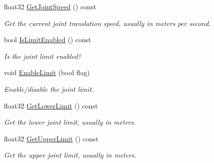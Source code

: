 \begin{DoxyCompactItemize}
\mbox{\label{classb2PrismaticJoint_af407d14ac024abdee49b852613f1bbc2}} 
float32 \mbox{\hyperlink{classb2PrismaticJoint_af407d14ac024abdee49b852613f1bbc2}{Get\+Joint\+Speed}} () const
\begin{DoxyCompactList}\small\item\em Get the current joint translation speed, usually in meters per second. \end{DoxyCompactList}\item 
\mbox{\label{classb2PrismaticJoint_a22e2442a17832f718447c63c9c6263c8}} 
bool \mbox{\hyperlink{classb2PrismaticJoint_a22e2442a17832f718447c63c9c6263c8}{Is\+Limit\+Enabled}} () const
\begin{DoxyCompactList}\small\item\em Is the joint limit enabled? \end{DoxyCompactList}\item 
\mbox{\label{classb2PrismaticJoint_a6d419afe7bd4b0e36d2e4607df7f79f2}} 
void \mbox{\hyperlink{classb2PrismaticJoint_a6d419afe7bd4b0e36d2e4607df7f79f2}{Enable\+Limit}} (bool flag)
\begin{DoxyCompactList}\small\item\em Enable/disable the joint limit. \end{DoxyCompactList}\item 
\mbox{\label{classb2PrismaticJoint_a10a2d3c03164190d279fa3c72eafb49e}} 
float32 \mbox{\hyperlink{classb2PrismaticJoint_a10a2d3c03164190d279fa3c72eafb49e}{Get\+Lower\+Limit}} () const
\begin{DoxyCompactList}\small\item\em Get the lower joint limit, usually in meters. \end{DoxyCompactList}\item 
\mbox{\label{classb2PrismaticJoint_aabae1da55e500b9c77007de4d085ffda}} 
float32 \mbox{\hyperlink{classb2PrismaticJoint_aabae1da55e500b9c77007de4d085ffda}{Get\+Upper\+Limit}} () const
\begin{DoxyCompactList}\small\item\em Get the upper joint limit, usually in meters. \end{DoxyCompactList}\item 

\end{DoxyCompactItemize}
